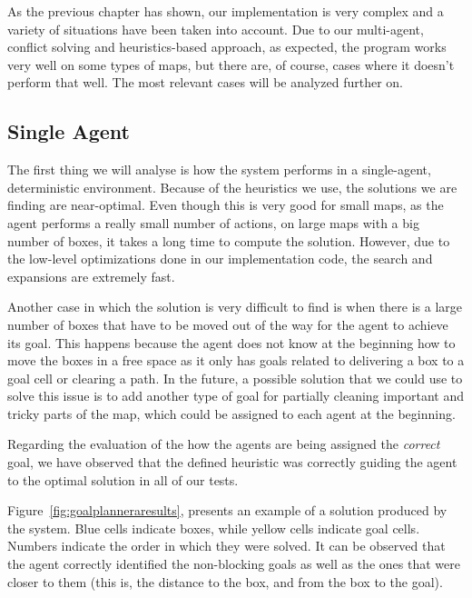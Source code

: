 
As the previous chapter has shown, our implementation is very complex and a variety of situations have been
taken into account. Due to our multi-agent, conflict solving and heuristics-based approach, as expected, the
program works very well on some types of maps,  but there are, of course, cases where it doesn't perform that
well. The most relevant cases will be analyzed further on.

\subsection{Single Agent}

The first thing we will analyse is how the system performs in a single-agent, deterministic environment.
Because of the heuristics we use, the solutions we are finding are near-optimal. Even though this is very good
for small maps, as the agent performs a really small number of actions, on large maps with a big number of
boxes, it takes a long time to compute the solution. However, due to the low-level optimizations done in our
implementation code, the search and expansions are extremely fast.

Another case in which the solution is very difficult to find is when there is a large number of boxes that
have to be moved out of the way for the agent to achieve its goal. This happens because the agent does not
know at the beginning how to move the boxes in a free space as it only has goals related to delivering a box
to a goal cell or clearing a path. In the future, a possible solution that we could use to solve this issue is
to add another type of goal for partially cleaning important and tricky parts of the map, which could be
assigned to each agent at the beginning.

Regarding the evaluation of the how the agents are being assigned the \textit{correct} goal, we have observed
that the defined heuristic was correctly guiding the agent to the optimal solution in all of our tests.

Figure~\ref{fig:goalplanneraresults}, presents an example of a solution produced by the system. Blue cells indicate boxes, while yellow cells indicate goal cells. Numbers indicate the order in which they were solved. It can be observed that the agent correctly identified the non-blocking goals as well as the ones that were closer to them (this is, the distance to the box, and from the box to the goal).

